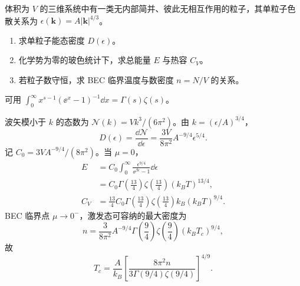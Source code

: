 
\begin{question}
体积为 $V$ 的三维系统中有一类无内部简并、彼此无相互作用的粒子，其单粒子色散关系为 $\epsilon(\bm k)=A|\bm k|^{4/3}$。
\begin{enumerate}
\item 求单粒子能态密度 $D(\epsilon)$。
\item 化学势为零的玻色统计下，求总能量 $E$ 与热容 $C_V$。
\item 若粒子数守恒，求 BEC 临界温度与数密度 $n=N/V$ 的关系。
\end{enumerate}
可用 $\int_0^\infty x^{s-1}(\ee^x-1)^{-1}\dd{x}=\Gamma(s)\zeta(s)$。
\begin{solution}
波矢模小于 $k$ 的态数为 $\mathcal N(k)=Vk^3/(6\pi^2)$。由 $k=(\epsilon/A)^{3/4}$，
\[\boxed{D(\epsilon)=\frac{\dd{\mathcal N}}{\dd{\epsilon}}=\frac{3V}{8\pi^2}A^{-9/4}\epsilon^{5/4}}.\]
记 $C_0=3V A^{-9/4}/(8\pi^2)$。当 $\mu=0$，
\begin{align*}
E&=C_0\int_0^\infty\frac{\epsilon^{9/4}}{\ee^{\beta\epsilon}-1}\dd{\epsilon}\\
&=\boxed{C_0\Gamma\!\left(\frac{13}{4}\right)\zeta\!\left(\frac{13}{4}\right)(k_BT)^{13/4}},\\
C_V&=\boxed{\frac{13}{4}C_0\Gamma\!\left(\frac{13}{4}\right)\zeta\!\left(\frac{13}{4}\right)k_B(k_BT)^{9/4}}.
\end{align*}
BEC 临界点 $\mu\to0^-$，激发态可容纳的最大密度为
\[n=\frac{3}{8\pi^2}A^{-9/4}\Gamma\!\left(\frac94\right)\zeta\!\left(\frac94\right)(k_BT_c)^{9/4},\]
故
\[\boxed{T_c=\frac{A}{k_B}\left[\frac{8\pi^2n}{3\Gamma(9/4)\zeta(9/4)}\right]^{4/9}}.\]
\end{solution}
\end{question}

